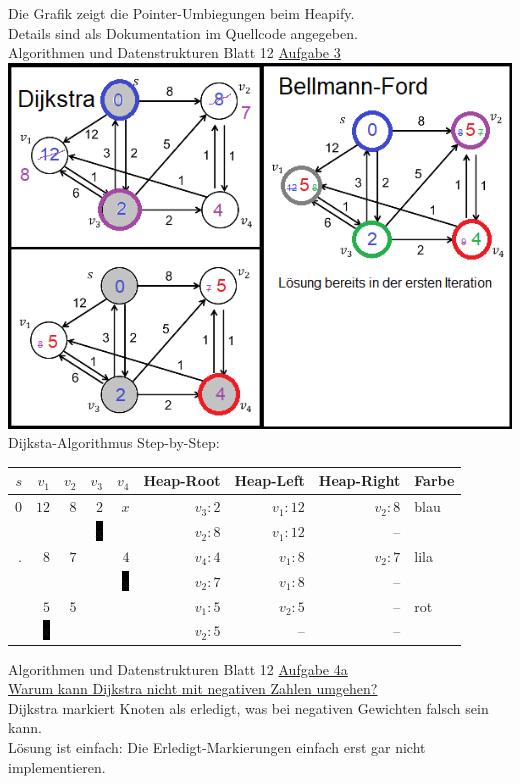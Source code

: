 \documentclass[12pt]{article} %
\newcommand{\aufgabe}[2]{{\LARGE Algorithmen und Datenstrukturen Blatt #1 \underline{Aufgabe #2}}\\[3.5ex]  }
\newcommand{\aufgabenstellung}[1]{\underline {#1}\\[2ex]}
\begin{document}
Die Grafik zeigt die Pointer-Umbiegungen beim Heapify. \\Details sind als Dokumentation im Quellcode angegeben. \\
\newpage
\aufgabe{12}{3}
\includegraphics{Blatt12A3.png} \\
Dijksta-Algorithmus Step-by-Step: \\
\begin{tabular}{| r r r r r | r r r | l |}
\hline
$s$ & $v_{1}$ & $v_{2}$ & $v_{3}$ & $v_{4}$ & Heap-Root & Heap-Left & Heap-Right & Farbe \\ \hline \hline
$0$ & $12$ & $8$ & $2$ & $x$ & $v_{3}: 2$ & $v_{1}: 12$ & $v_{2}: 8$ & blau \\ 
 &  &  & \colorbox{black}{x} &  & $v_{2}: 8$ & $v_{1}: 12$ & -- &  \\ \hline
. & $8$ & $7$ &  & $4$ & $v_{4}: 4$ & $v_{1}: 8$ & $v_{2}: 7$ & lila \\ 
 &  &  &  & \colorbox{black}{x} & $v_{2}: 7$ & $v_{1}: 8$ & -- &  \\ \hline
 & $5$ & $5$ &  &  & $v_{1}: 5$ & $v_{2}: 5$ & -- & rot \\ 
 & \colorbox{black}{x} &  &  &  & $v_{2}: 5$ & -- & -- &  \\ \hline
\end{tabular}
\newpage
\aufgabe{12}{4a}
\aufgabenstellung{Warum kann Dijkstra nicht mit negativen Zahlen umgehen?}
Dijkstra markiert Knoten als erledigt, was bei negativen Gewichten falsch sein kann. \\
Lösung ist einfach: Die Erledigt-Markierungen einfach erst gar nicht implementieren. \\[2ex]
\end{document}
